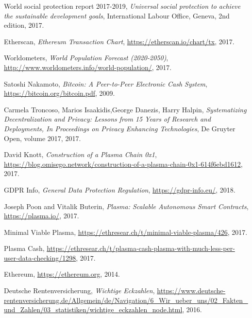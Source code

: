 \begin{thebibliography}{9}

  World social protection report 2017-2019,
   \textit{Universal social protection to achieve the sustainable development goals},
  International Labour Office, Geneva,
  2nd edition,
  2017.

  Etherscan,
  \textit{Ethereum Transaction Chart},
  \url{https://etherscan.io/chart/tx},
  2017.

  Worldometers,
  \textit{World Population Forecast (2020-2050)},
  \url{http://www.worldometers.info/world-population/},
  2017.  

  Satoshi Nakamoto,
  \textit{Bitcoin: A Peer-to-Peer Electronic Cash System},
  \url{https://bitcoin.org/bitcoin.pdf},
  2009.
  
  Carmela Troncoso, Marios Isaakidis,George Danezis, Harry Halpin,
  \textit{Systematizing Decentralization and Privacy: Lessons from 15 Years of Research and Deployments, In Proceedings on Privacy Enhancing Technologies},
  De Gruyter Open,
  volume 2017,
  2017.

  David Knott,
  \textit{Construction of a Plasma Chain 0x1},
  \url{https://blog.omisego.network/construction-of-a-plasma-chain-0x1-614f6ebd1612},
  2017.
  
  GDPR Info,
  \textit{General Data Protection Regulation},
  \url{https://gdpr-info.eu/},
  2018.  
  
  Joseph Poon and Vitalik Buterin, 
  \textit{Plasma: Scalable Autonomous Smart Contracts},
  \url{https://plasma.io/},
  2017.
  
  Minimal Viable Plasma,
  \url{https://ethresear.ch/t/minimal-viable-plasma/426},
  2017.
  
  Plasma Cash,
  \url{https://ethresear.ch/t/plasma-cash-plasma-with-much-less-per-user-data-checking/1298},
  2017.
  
  Ethereum,
  \url{https://ethereum.org},
  2014.

  Deutsche Rentenversicherung,
  \textit{Wichtige Eckzahlen},
  \url{https://www.deutsche-rentenversicherung.de/Allgemein/de/Navigation/6_Wir_ueber_uns/02_Fakten_und_Zahlen/03_statistiken/wichtige_eckzahlen_node.html},
  2016.


\end{thebibliography}
